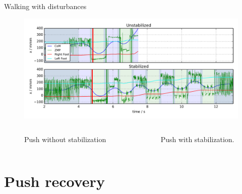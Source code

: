 \begin{frame}{Walking with disturbances}

\begin{figure}
  \begin{center}
     \includegraphics[width=\textwidth]{images/disturbed_front_straight_x.png}
  \end{center}
\end{figure}

\vspace{-2.5em}\begin{columns}
\begin{column}{5cm}
\begin{figure}
  \begin{center}
  \end{center}
  \caption{Push without stabilization}
\end{figure}
\end{column}

\begin{column}{5cm}
\begin{figure}
  \begin{center}
  \end{center}
  \caption{Push with stabilization.}
\end{figure}
\end{column}

\end{columns}

\end{frame}

\section{Push recovery}\label{push-recovery}

